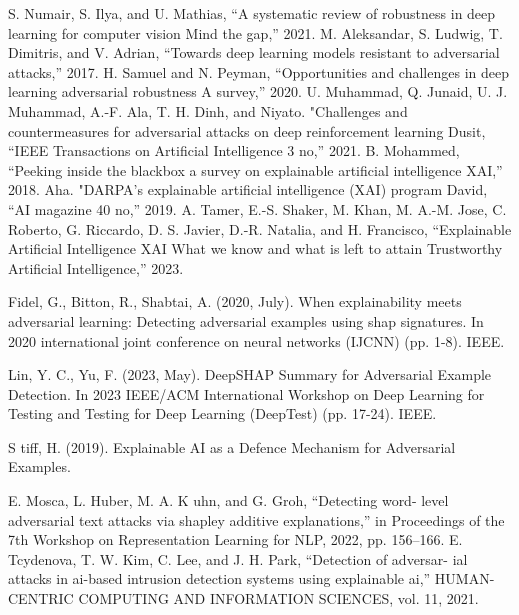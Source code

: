 \documentclass[10pt, conference, a4paper, final]{IEEEtran}
\begin{document}
\begin{thebibliography}{01}

    S. Numair, S. Ilya, and U. Mathias, “A systematic review of robustness in deep learning for computer vision Mind the gap,” 2021.
    M. Aleksandar, S. Ludwig, T. Dimitris, and V. Adrian, “Towards deep learning models resistant to adversarial attacks,” 2017.
    H. Samuel and N. Peyman, “Opportunities and challenges in deep learning adversarial robustness A survey,” 2020.
    U. Muhammad, Q. Junaid, U. J. Muhammad, A.-F. Ala, T. H. Dinh, and Niyato. "Challenges and countermeasures for adversarial attacks on deep reinforcement learning Dusit, “IEEE Transactions on Artificial Intelligence 3 no,” 2021.
    B. Mohammed, “Peeking inside the blackbox a survey on explainable artificial intelligence XAI,” 2018.
    Aha. "DARPA’s explainable artificial intelligence (XAI) program David, “AI magazine 40 no,” 2019.
    A. Tamer, E.-S. Shaker, M. Khan, M. A.-M. Jose, C. Roberto, G. Riccardo, D. S. Javier, D.-R. Natalia, and H. Francisco, “Explainable Artificial Intelligence XAI What we know and what is left to attain Trustworthy Artificial Intelligence,” 2023.


     Fidel, G., Bitton, R.,  Shabtai, A. (2020, July). When explainability meets adversarial learning: Detecting adversarial examples using shap signatures. In 2020 international joint conference on neural networks (IJCNN) (pp. 1-8). IEEE.

     Lin, Y. C., Yu, F. (2023, May). DeepSHAP Summary for Adversarial Example Detection. In 2023 IEEE/ACM International Workshop on Deep Learning for Testing and Testing for Deep Learning (DeepTest) (pp. 17-24). IEEE.

    S tiff, H. (2019). Explainable AI as a Defence Mechanism for Adversarial Examples.

     E. Mosca, L. Huber, M. A. K uhn, and G. Groh, “Detecting word-
    level adversarial text attacks via shapley additive explanations,” in
    Proceedings of the 7th Workshop on Representation Learning for NLP,
    2022, pp. 156–166.
     E. Tcydenova, T. W. Kim, C. Lee, and J. H. Park, “Detection of adversar-
    ial attacks in ai-based intrusion detection systems using explainable ai,”
    HUMAN-CENTRIC COMPUTING AND INFORMATION SCIENCES,
    vol. 11, 2021.




\end{thebibliography}
\end{document}
